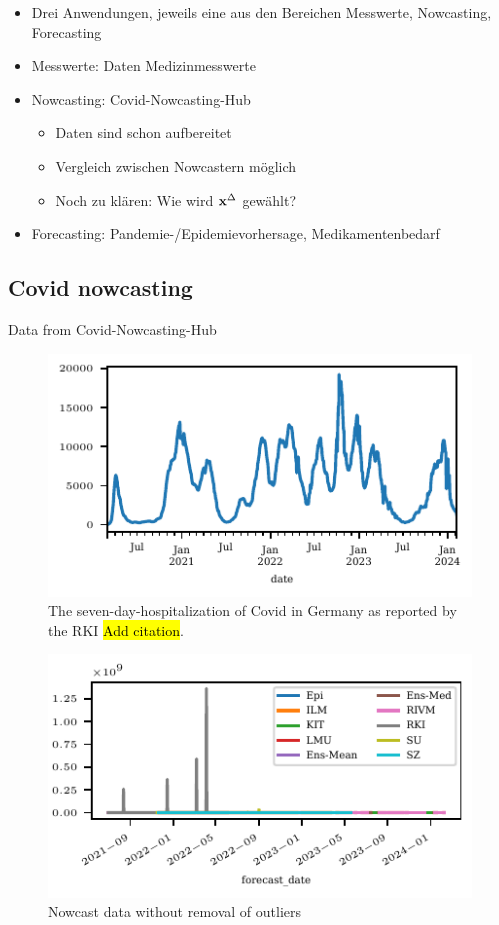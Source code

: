 \begin{itemize}
    \item Drei Anwendungen, jeweils eine aus den Bereichen Messwerte, Nowcasting, Forecasting
    \item Messwerte: Daten Medizinmesswerte
    \item Nowcasting: Covid-Nowcasting-Hub
    \begin{itemize}
        \item Daten sind schon aufbereitet
        \item Vergleich zwischen Nowcastern möglich
        \item Noch zu klären: Wie wird $\mathbf{x}^{\Delta}$ gewählt?
    \end{itemize}
    \item Forecasting: Pandemie-/Epidemievorhersage, Medikamentenbedarf
\end{itemize}

\subsection{Covid nowcasting}

Data from Covid-Nowcasting-Hub


\begin{figure}
    \centering
    \includegraphics{plots/covid_nowcast/00_true_data.pdf}
    \caption{The seven-day-hospitalization of Covid in Germany as reported by the RKI \hl{Add citation}.}
    \label{fig:app-covid-true}
\end{figure}

\begin{figure}
    \centering
    \includegraphics{plots/covid_nowcast/00_nowcast_data.pdf}
    \caption{Nowcast data without removal of outliers}
    \label{fig:app-covid-nowcast}
\end{figure}

